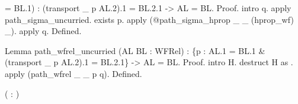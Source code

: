 \begin{coqdoccode}
\begin{coqdoccomment}
=\coqdocindent{0.50em}
BL.1)\coqdocindent{0.50em}
:\coqdocindent{0.50em}
\coqdoceol
\coqdocindent{1.00em}
(transport\coqdocindent{0.50em}
\_\coqdocindent{0.50em}
p\coqdocindent{0.50em}
AL.2).1\coqdocindent{0.50em}
=\coqdocindent{0.50em}
BL.2.1\coqdocindent{0.50em}
->\coqdocindent{0.50em}
AL\coqdocindent{0.50em}
=\coqdocindent{0.50em}
BL.\coqdoceol
Proof.\coqdoceol
\coqdocindent{1.00em}
intro\coqdocindent{0.50em}
q.\coqdocindent{0.50em}
apply\coqdocindent{0.50em}
path\_sigma\_uncurried.\coqdocindent{0.50em}
exists\coqdocindent{0.50em}
p.\coqdoceol
\coqdocindent{1.00em}
apply\coqdocindent{0.50em}
(@path\_sigma\_hprop\coqdocindent{0.50em}
\_\coqdocindent{0.50em}
\_\coqdocindent{0.50em}
(hprop\_wf)\coqdocindent{0.50em}
\_).\coqdoceol
\coqdocindent{1.00em}
apply\coqdocindent{0.50em}
q.\coqdoceol
Defined.\coqdoceol
\end{coqdoccomment}
\coqdoceol
\coqdocemptyline
\coqdocnoindent
\begin{coqdoccomment}
\coqdoceol
Lemma\coqdocindent{0.50em}
path\_wfrel\_uncurried\coqdocindent{0.50em}
(AL\coqdocindent{0.50em}
BL\coqdocindent{0.50em}
:\coqdocindent{0.50em}
WFRel)\coqdocindent{0.50em}
:\coqdoceol
\coqdocindent{1.00em}
\{p\coqdocindent{0.50em}
:\coqdocindent{0.50em}
AL.1\coqdocindent{0.50em}
=\coqdocindent{0.50em}
BL.1\coqdocindent{0.50em}
\&\coqdocindent{0.50em}
(transport\coqdocindent{0.50em}
\_\coqdocindent{0.50em}
p\coqdocindent{0.50em}
AL.2).1\coqdocindent{0.50em}
=\coqdocindent{0.50em}
BL.2.1\}\coqdocindent{0.50em}
->\coqdocindent{0.50em}
AL\coqdocindent{0.50em}
=\coqdocindent{0.50em}
BL.\coqdoceol
Proof.\coqdoceol
\coqdocindent{1.00em}
intro\coqdocindent{0.50em}
H.\coqdocindent{0.50em}
destruct\coqdocindent{0.50em}
H\coqdocindent{0.50em}
as\coqdocindent{0.50em}
 .\coqdocindent{0.50em}
apply\coqdocindent{0.50em}
(path\_wfrel\coqdocindent{0.50em}
\_\coqdocindent{0.50em}
\_\coqdocindent{0.50em}
p\coqdocindent{0.50em}
q).\coqdoceol
Defined.\coqdoceol
\end{coqdoccomment}
\coqdoceol
\coqdocemptyline
\coqdocnoindent
{}  ( : )\coqdoceol
\coqdocindent{1.00em}

\end{coqdoccode}
